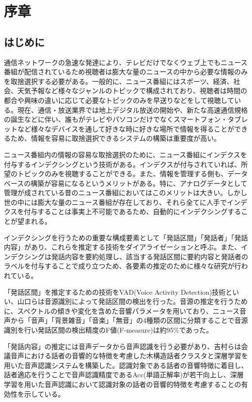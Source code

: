 \chapter{序章}
\section{はじめに}
通信ネットワークの急速な発達により、テレビだけでなくウェブ上でもニュース番組が配信されているため視聴者は膨大な量のニュースの中から必要な情報のみを取捨選択する必要がある。一般的に、ニュース番組にはスポーツ、経済、社会、天気予報など様々なジャンルのトピックで構成されており、視聴者は時間の都合や興味の違いに応じて必要なトピックのみを早送りなどをして視聴している。現在、通信・放送業界では地上デジタル放送の開始や、新たな高速通信規格の誕生などに伴い、誰もがテレビやパソコンだけでなくスマートフォン・タブレットなど様々なデバイスを通して好きな時に好きな場所で情報を得ることができるため、情報を容易に取捨選択できるシステムの構築は重要度が高い。\par

ニュース番組内の情報の容易な取捨選択のために、ニュース番組にインデクスを付与するインデクシングという技術がある。インデクスが付与されていれば、所望のトピックのみを視聴することができる。また、情報を管理する側も、データベースの構築が容易になるというメリットがある。特に、アナログデータとして管理が成されている昔のニュース番組においてはこのメリットは大きい。しかし世の中には膨大な量のニュース番組が存在しており、それら全てに人手でインデクスを付与することは事実上不可能であるため、自動的にインデクシングすることが望まれる。\par

インデクシングを行うための重要な構成要素として「発話区間」「発話者」「発話内容」があり、これらを推定する技術をダイアライゼーションと呼ぶ。また、インデクシングは発話内容を要約処理し、該当する発話区間に要約内容と発話者のラベルを付与することで成り立つため、各要素の推定のために様々な研究が行われている。\par

「発話区間」を推定するための技術をVAD(Voice Activity Detection)技術\cite{vad}といい、山口ら\cite{yamaguchi_indexing}は音源識別によって発話区間の検出を行った。音源の推定を行うために、スペクトルの傾きや変化を含めた音響パラメータを用いており、ニュース音声から「音声」「背景雑音」「音楽」「無音」の4種類の区間に分類することで音源識別を行い発話区間の検出精度のF値(F-measure)は約95\%であった。\par

「発話内容」の推定には音声データから音声認識を行う必要があり、吉村ら\cite{yoshimura_clustering}は会議音声における話者の音響的な特徴を考慮した木構造話者クラスタと深層学習を用いた音声認識システムを構築した。認識対象である話者の音響特徴に着目し、話者適応を行うことで音声認識精度であるAcc(単語正解率)が若干向上し、深層学習を用いた音声認識において認識対象の話者の音響的特徴を考慮することの有効性を示している。\par

